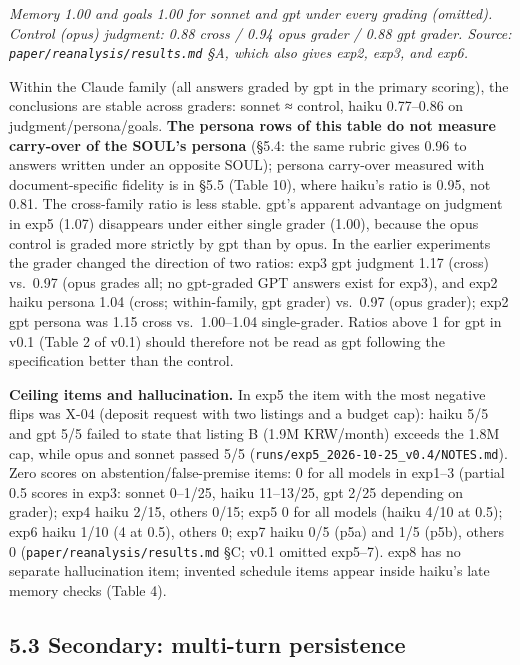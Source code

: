 \documentclass[10pt]{article}
\begin{document}
\emph{Memory 1.00 and goals 1.00 for sonnet and gpt under every grading (omitted). Control (opus) judgment: 0.88 cross / 0.94 opus grader / 0.88 gpt grader. Source: \texttt{paper/\allowbreak{}reanalysis/\allowbreak{}results.\allowbreak{}md} §A, which also gives exp2, exp3, and exp6.}

Within the Claude family (all answers graded by gpt in the primary scoring), the conclusions are stable across graders: sonnet ≈ control, haiku 0.77--0.86 on judgment/persona/goals. \textbf{The persona rows of this table do not measure carry-over of the SOUL's persona} (§5.4: the same rubric gives 0.96 to answers written under an opposite SOUL); persona carry-over measured with document-specific fidelity is in §5.5 (Table 10), where haiku's ratio is 0.95, not 0.81. The cross-family ratio is less stable. gpt's apparent advantage on judgment in exp5 (1.07) disappears under either single grader (1.00), because the opus control is graded more strictly by gpt than by opus. In the earlier experiments the grader changed the direction of two ratios: exp3 gpt judgment 1.17 (cross) vs.~0.97 (opus grades all; no gpt-graded GPT answers exist for exp3), and exp2 haiku persona 1.04 (cross; within-family, gpt grader) vs.~0.97 (opus grader); exp2 gpt persona was 1.15 cross vs.~1.00--1.04 single-grader. Ratios above 1 for gpt in v0.1 (Table 2 of v0.1) should therefore not be read as gpt following the specification better than the control.

\textbf{Ceiling items and hallucination.} In exp5 the item with the most negative flips was X-04 (deposit request with two listings and a budget cap): haiku 5/5 and gpt 5/5 failed to state that listing B (1.9M KRW/month) exceeds the 1.8M cap, while opus and sonnet passed 5/5 (\texttt{runs/\allowbreak{}exp5\_\allowbreak{}2026-\allowbreak{}10-\allowbreak{}25\_\allowbreak{}v0.\allowbreak{}4/\allowbreak{}NOTES.\allowbreak{}md}). Zero scores on abstention/false-premise items: 0 for all models in exp1--3 (partial 0.5 scores in exp3: sonnet 0--1/25, haiku 11--13/25, gpt 2/25 depending on grader); exp4 haiku 2/15, others 0/15; exp5 0 for all models (haiku 4/10 at 0.5); exp6 haiku 1/10 (4 at 0.5), others 0; exp7 haiku 0/5 (p5a) and 1/5 (p5b), others 0 (\texttt{paper/\allowbreak{}reanalysis/\allowbreak{}results.\allowbreak{}md} §C; v0.1 omitted exp5--7). exp8 has no separate hallucination item; invented schedule items appear inside haiku's late memory checks (Table 4).

\subsection{5.3 Secondary: multi-turn persistence}\label{secondary-multi-turn-persistence}
\end{document}
